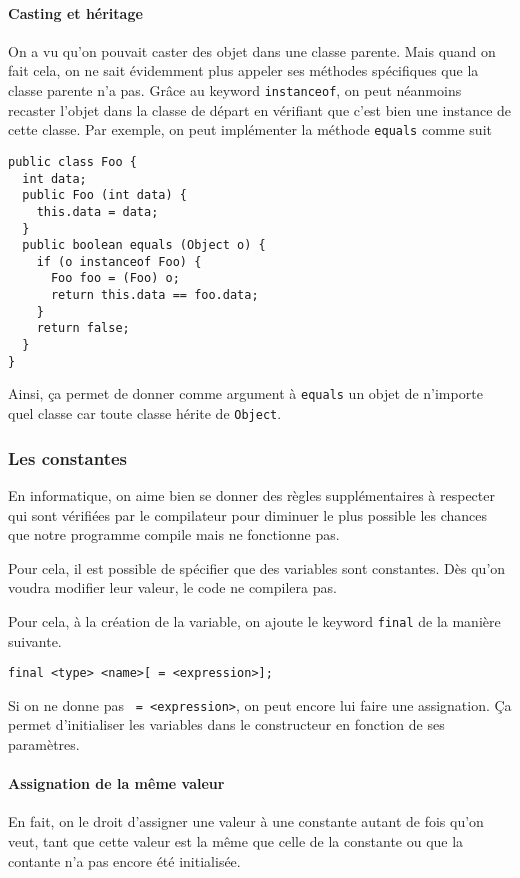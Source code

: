 \paragraph{Casting et héritage}
\label{sec:cast_class}
On a vu qu'on pouvait caster des objet dans une classe parente.
Mais quand on fait cela, on ne sait évidemment plus appeler ses méthodes
spécifiques que la classe parente n'a pas.
Grâce au keyword \verb|instanceof|, on peut néanmoins recaster l'objet
dans la classe de départ en vérifiant que c'est bien une instance de cette
classe.
Par exemple, on peut implémenter la méthode \verb|equals| comme suit
\begin{lstlisting}
public class Foo {
  int data;
  public Foo (int data) {
    this.data = data;
  }
  public boolean equals (Object o) {
    if (o instanceof Foo) {
      Foo foo = (Foo) o;
      return this.data == foo.data;
    }
    return false;
  }
}
\end{lstlisting}
Ainsi, ça permet de donner comme argument à \verb|equals| un objet de
n'importe quel classe car toute classe hérite de \verb|Object|.

\subsubsection{Les constantes}
En informatique, on aime bien se donner des règles supplémentaires à respecter
qui sont vérifiées par le compilateur pour diminuer le plus possible les
chances que notre programme compile mais ne fonctionne pas.

Pour cela, il est possible de spécifier que des variables sont constantes.
Dès qu'on voudra modifier leur valeur, le code ne compilera pas.

Pour cela, à la création de la variable, on ajoute le keyword \verb|final|
de la manière suivante.
\begin{lstlisting}
final <type> <name>[ = <expression>];
\end{lstlisting}
Si on ne donne pas \verb| = <expression>|, on peut encore lui faire une
assignation.
Ça permet d'initialiser les variables dans le constructeur en fonction
de ses paramètres.

\paragraph{Assignation de la même valeur}
En fait, on le droit d'assigner une valeur à une constante autant de
fois qu'on veut, tant que cette valeur est la même que celle de la constante
ou que la contante n'a pas encore été initialisée.

